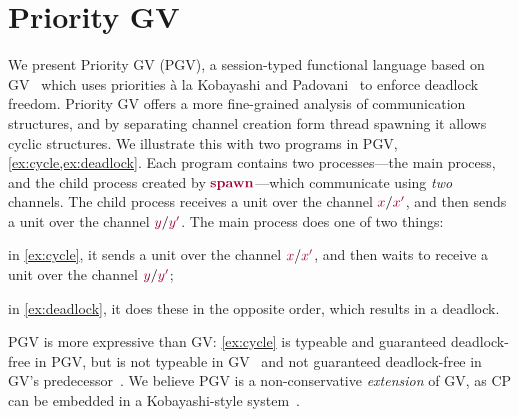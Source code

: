 \documentclass[main.tex]{subfiles}
\begin{document}
\section{Priority GV}\label{sec:pgv}

We present Priority GV (PGV), a session-typed functional language based on GV~\cite{wadler15,lindleymorris15} which uses priorities \`{a} la Kobayashi and Padovani~\cite{kobayashi06,padovaninovara15} to enforce deadlock freedom.
Priority GV offers a more fine-grained analysis of communication structures, and by separating channel creation form thread spawning it allows cyclic structures.
We illustrate this with two programs in PGV, \cref{ex:cycle,ex:deadlock}. Each program contains two processes---the main process, and the child process created by $\tm{\spawn}$---which communicate using \emph{two} channels. The child process receives a unit over the channel $\tm{x}/\tm{x'}$, and then sends a unit over the channel $\tm{y}/\tm{y'}$. The main process does one of two things:
\begin{enumerate*}[label= (\alph*) ]
\item in \cref{ex:cycle}, it sends a unit over the channel $\tm{x}/\tm{x'}$, and then waits to receive a unit over the channel $\tm{y}/\tm{y'}$;
\item in \cref{ex:deadlock}, it does these in the opposite order, which results in a deadlock.
\end{enumerate*}
PGV is more expressive than GV: \cref{ex:cycle} is typeable and guaranteed deadlock-free in PGV, but is not typeable in GV~\cite{wadler14} and not guaranteed deadlock-free in GV's predecessor~\cite{gayvasconcelos10}. We believe PGV is a non-conservative \emph{extension} of GV, as CP can be embedded in a Kobayashi-style system~\cite{dardhaperez15extended}.
\end{document}
